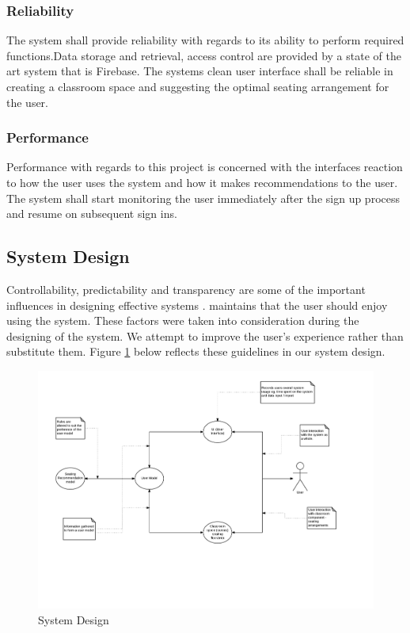 \subsubsection{Reliability}
The system shall provide reliability with regards to its ability to perform required functions.Data storage and retrieval, access control are provided by a state of the art system that is Firebase. The systems clean user interface shall be reliable in creating a classroom space and suggesting the optimal seating arrangement for the user.

\subsubsection{Performance}
Performance with regards to this project is concerned with the interfaces reaction to how the user uses the system and how it makes recommendations to the user. The system shall start monitoring the user immediately after the sign up process and resume on subsequent sign ins. 

\subsection{System Design}
Controllability, predictability and transparency are some of the important influences in designing effective systems \cite{hook1995glass}. \cite{rudisill1996human} maintains that the user should enjoy using the system. These factors were taken into consideration during the designing of the system. We attempt to improve the user's experience rather than substitute them. Figure \ref{fig:SystemDesign} below reflects these guidelines in our system design.

\begin{figure}[!ht]
\caption{System Design}
    \label{fig:SystemDesign}
    \centering
    \includegraphics[scale=0.5]{figures/SystemDesign}
\end{figure}


